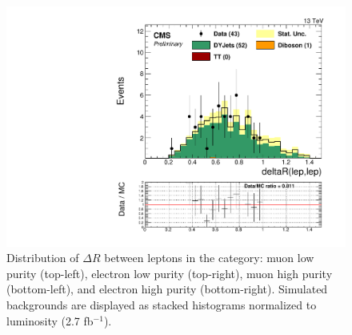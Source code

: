 \begin{figure}[h]
\begin{center}
\includegraphics[scale=0.37]{figures/control/deltaRleplepEHP.pdf}
\caption[Distribution of $\Delta R$ between leptons]{Distribution of $\Delta R$ between leptons in the category: muon low purity (top-left), electron low purity (top-right), muon high purity (bottom-left), and  electron high purity (bottom-right). Simulated backgrounds are displayed as stacked histograms normalized to luminosity (2.7 fb$^{-1}$).}
\label{deltaRleplep_VZ}
\end{center}
\end{figure}

